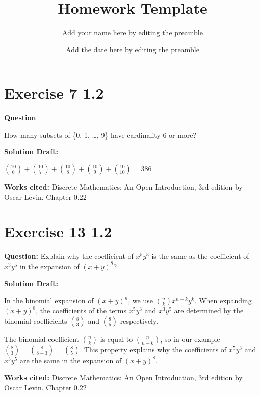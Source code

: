 \documentclass{article}
\title{Homework Template}
\author{Add your name here by editing the preamble}
\date{Add the date here by editing the preamble}
\begin{document}
\maketitle



\section*{Exercise 7 1.2}  


\vspace{0.5cm} %

\noindent\textbf{Question}

How many subsets of \{0, 1, \ldots, 9\} have cardinality 6 or more?

\noindent\textbf{Solution Draft:} 
\vspace{0.2cm}

$\binom{10}{6} + \binom{10}{7} + \binom{10}{8} + \binom{10}{9} + \binom{10}{10} = 386$


\vspace{0.5cm}
\textbf{Works cited:}
Discrete Mathematics: An Open Introduction, 3rd edition by Oscar Levin. Chapter 0.22

\section*{Exercise 13 1.2}  


\vspace{0.5cm} %
\noindent\textbf{Question:} 
Explain why the coefficient of $ x^5y^3 $ is the same as the coefficient of $ x^3y^5 $ in the expansion of $ {(x + y)}^8 $?

\noindent\textbf{Solution Draft:} 

In the binomial expansion of $ {(x + y)}^n $, we use $ \binom{n}{k} x^{n-k}y^k $. When expanding $ {(x + y)}^{8} $, the coefficients of the terms $ x^5y^3 $ and $ x^3y^5 $ are determined by the binomial coefficients $ \binom{8}{3} $ and $ \binom{8}{5} $ respectively.

The binomial coefficient $ \binom{n}{k} $ is equal to $ \binom{n}{n-k} $, so in our example $ \binom{8}{3} = \binom{8}{8-3} = \binom{8}{5} $. This property explains why the coefficients of $ x^5y^3 $ and $ x^3y^5 $ are the same in the expansion of $ {(x + y)}^8 $.

\vspace{0.5cm}
\textbf{Works cited:}
Discrete Mathematics: An Open Introduction, 3rd edition by Oscar Levin. Chapter 0.22
\end{document}
